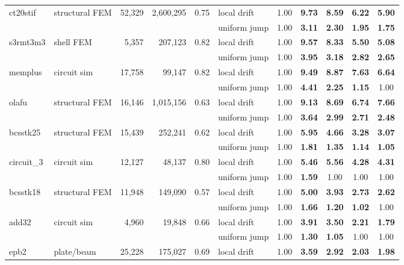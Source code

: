 \begin{tabular}{llrrrlccccc}
ct20stif & structural FEM & 52,329 & 2,600,295 & 0.75 & local drift & 1.00 & \textbf{9.73} & \textbf{8.59} & \textbf{6.22} & \textbf{5.90} \\
 &  &  &  &  & uniform jump & 1.00 & \textbf{3.11} & \textbf{2.30} & \textbf{1.95} & \textbf{1.75} \\
s3rmt3m3 & shell FEM & 5,357 & 207,123 & 0.82 & local drift & 1.00 & \textbf{9.57} & \textbf{8.33} & \textbf{5.50} & \textbf{5.08} \\
 &  &  &  &  & uniform jump & 1.00 & \textbf{3.95} & \textbf{3.18} & \textbf{2.82} & \textbf{2.65} \\
memplus & circuit sim & 17,758 & 99,147 & 0.82 & local drift & 1.00 & \textbf{9.49} & \textbf{8.87} & \textbf{7.63} & \textbf{6.64} \\
 &  &  &  &  & uniform jump & 1.00 & \textbf{4.41} & \textbf{2.25} & \textbf{1.15} & 1.00 \\
olafu & structural FEM & 16,146 & 1,015,156 & 0.63 & local drift & 1.00 & \textbf{9.13} & \textbf{8.69} & \textbf{6.74} & \textbf{7.66} \\
 &  &  &  &  & uniform jump & 1.00 & \textbf{3.64} & \textbf{2.99} & \textbf{2.71} & \textbf{2.48} \\
bcsstk25 & structural FEM & 15,439 & 252,241 & 0.62 & local drift & 1.00 & \textbf{5.95} & \textbf{4.66} & \textbf{3.28} & \textbf{3.07} \\
 &  &  &  &  & uniform jump & 1.00 & \textbf{1.81} & \textbf{1.35} & \textbf{1.14} & \textbf{1.05} \\
circuit\_3 & circuit sim & 12,127 & 48,137 & 0.80 & local drift & 1.00 & \textbf{5.46} & \textbf{5.56} & \textbf{4.28} & \textbf{4.31} \\
 &  &  &  &  & uniform jump & 1.00 & \textbf{1.59} & 1.00 & 1.00 & 1.00 \\
bcsstk18 & structural FEM & 11,948 & 149,090 & 0.57 & local drift & 1.00 & \textbf{5.00} & \textbf{3.93} & \textbf{2.73} & \textbf{2.62} \\
 &  &  &  &  & uniform jump & 1.00 & \textbf{1.66} & \textbf{1.20} & \textbf{1.02} & 1.00 \\
add32 & circuit sim & 4,960 & 19,848 & 0.66 & local drift & 1.00 & \textbf{3.91} & \textbf{3.50} & \textbf{2.21} & \textbf{1.79} \\
 &  &  &  &  & uniform jump & 1.00 & \textbf{1.30} & \textbf{1.05} & 1.00 & 1.00 \\
epb2 & plate/beam & 25,228 & 175,027 & 0.69 & local drift & 1.00 & \textbf{3.59} & \textbf{2.92} & \textbf{2.03} & \textbf{1.98} \\

\end{tabular}
